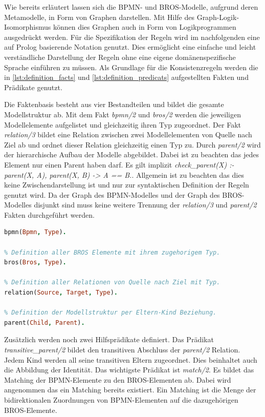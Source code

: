 Wie bereits erläutert lassen sich die BPMN- und BROS-Modelle, aufgrund deren Metamodelle, in Form von Graphen darstellen.
Mit Hilfe des Graph-Logik-Isomorphismus können dies Graphen auch in Form von Logikprogrammen ausgedrückt werden.
Für die Spezifikation der Regeln wird im nachfolgenden eine auf Prolog basierende Notation genutzt.
Dies ermöglicht eine einfache und leicht verständliche Darstellung der Regeln ohne eine eigene domänenspezifische Sprache einführen zu müssen.
Als Grundlage für die Konsistenzregeln werden die in \cref{lst:definition_facts} und \cref{lst:definition_predicats} aufgestellten Fakten und Prädikate genutzt.

Die Faktenbasis besteht aus vier Bestandteilen und bildet die gesamte Modellstruktur ab.
Mit dem Fakt \emph{bpmn/2} und \emph{bros/2} werden die jeweiligen Modellelemente aufgelistet und gleichzeitig ihren Typ zugeordnet.
Der Fakt \emph{relation/3} bildet eine Relation zwischen zwei Modellelementen von Quelle nach Ziel ab und ordnet dieser Relation gleichzeitig einen Typ zu.
Durch \emph{parent/2} wird der hierarchische Aufbau der Modelle abgebildet.
Dabei ist zu beachten das jedes Element nur einen Parent haben darf.
Es gilt implizit \emph{check\_parent(X) :- parent(X, A), parent(X, B) -> A == B.}.
Allgemein ist zu beachten das dies keine Zwischendarstellung ist und nur zur syntaktischen Definition der Regeln genutzt wird.
Da der Graph des BPMN-Modelles und der Graph des BROS-Modelles disjunkt sind muss keine weitere Trennung der \emph{relation/3} und \emph{parent/2} Fakten durchgeführt werden.

\begin{lstlisting}[language=Prolog, caption=Definitionen der Faktenbasis, label=lst:definition_facts]
% Definition aller BPMN Elemente mit ihrem zugehorigem Typ.
bpmn(Bpmn, Type).

% Definition aller BROS Elemente mit ihrem zugehorigem Typ.
bros(Bros, Type).

% Definition aller Relationen von Quelle nach Ziel mit Typ.
relation(Source, Target, Type).

% Definition der Modellstruktur per Eltern-Kind Beziehung.
parent(Child, Parent).
\end{lstlisting}

Zusätzlich werden noch zwei Hilfsprädikate definiert.
Das Prädikat \emph{transitive\_parent/2} bildet den transitiven Abschluss der \emph{parent/2} Relation.
Jedem Kind werden all seine transitiven Eltern zugeordnet.
Dies beinhaltet auch die Abbildung der Identität.
Das wichtigste Prädikat ist \emph{match/2}.
Es bildet das Matching der BPMN-Elemente zu den BROS-Elementen ab.
Dabei wird angenommen das ein Matching bereits existiert.
Ein Matching ist die Menge der bidirektionalen Zuordnungen von BPMN-Elementen auf die dazugehörigen BROS-Elemente. 

